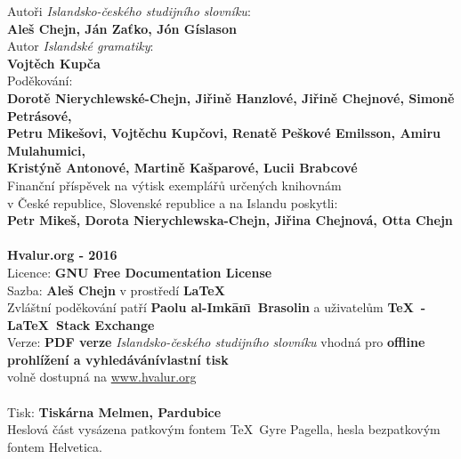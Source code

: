 \noindent\begin{minipage}[t][\textheight][t]{\textwidth}
Autoři \textit{Islandsko-českého studijního slovníku}:\\
  \textbf{Aleš Chejn, Ján Zaťko, Jón Gíslason}\\[\baselineskip]
\ifPDF
\else
Autor \textit{Islandské gramatiky}:\\
  \textbf{Vojtěch Kupča}\\[\baselineskip]
\fi
Poděkování:\\
  \textbf{Dorotě Nierychlewské-Chejn, Jiřině Hanzlové, Jiřině Chejnové,
          Simoně Petrásové,\\ Petru Mikešovi, Vojtěchu Kupčovi, 
          Renatě Peškové Emilsson, Amiru Mulahumici, \\ Kristýně Antonové, 
          Martině Kašparové, Lucii Brabcové}\\[\baselineskip]
Finanční příspěvek na výtisk exemplářů určených knihovnám\\ v České republice,
Slovenské republice a na Islandu poskytli:\\
  \textbf{Petr Mikeš, Dorota Nierychlewska-Chejn, Jiřina Chejnová, Otta Chejn}
  \ifPDF
  \\[39\baselineskip]
  \else
  \\[36\baselineskip]
  \fi
\textbf{Hvalur.org - 2016}\\
Licence: \textbf{GNU Free Documentation License}\\
Sazba: \textbf{Aleš Chejn} v prostředí  \textbf\LaTeX\\
  Zvláštní poděkování patří \textbf{Paolu al-Imk\=an\=\i\ Brasolin} a uživatelům  \textbf{\TeX\ - \LaTeX\ Stack Exchange}\\[\baselineskip]
\ifPDF
Verze: \textbf{PDF verze} \textit{Islandsko-českého studijního slovníku} vhodná pro \textbf{\ifscreen offline prohlížení a vyhledávání\else vlastní tisk\fi}\\ volně dostupná na \url{www.hvalur.org}\\[\baselineskip]
\else
\textbf\ISBN\\[\baselineskip]
\fi
\ifPDF
\else
Tisk: \textbf{Tiskárna Melmen, Pardubice}\\
\fi
Heslová část vysázena patkovým fontem \TeX\ Gyre Pagella,
hesla bezpatkovým fontem {\phvfamily Helvetica}.
\end{minipage}


\cleardoublepage 

